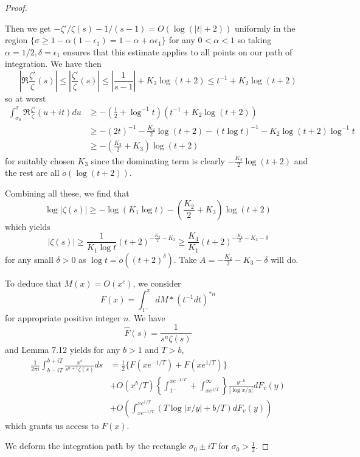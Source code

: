 \documentclass[12pt]{article}
\newcommand{\Abs}[1]{\left| #1 \right|}
\newcommand{\Fhat}{\widehat{F}}
\begin{document}
\begin{proof}
\begin{itemize}
Then we get $-\zeta'/\zeta(s) - 1/(s - 1) = O(\log(|t| + 2))$ uniformly in the region $\{\sigma \geq 1 - \alpha (1 - \epsilon_1) = 1 - \alpha + \alpha \epsilon_1 \}$ for any $0 < \alpha < 1$ so taking $\alpha = 1/2, \delta = \epsilon_1$ ensures that this estimate applies to all points on our path of integration. We have then
$$\Abs{ \Re \frac{\zeta'}{\zeta}(s) } \leq \Abs{ \frac{\zeta'}{\zeta}(s) } \leq \Abs{ \frac{1}{s - 1} } + K_2 \log(t + 2) \leq t^{-1} + K_2 \log(t + 2)$$
so at worst
\begin{align*}
\int_{\sigma_0}^\sigma \Re \frac{\zeta'}{\zeta}(u + it) du &\geq -\left(\frac12 + \log^{-1} t\right)(t^{-1} + K_2 \log(t + 2))\\
&\geq -(2t)^{-1} - \frac{K_2}{2} \log(t + 2) - (t \log t)^{-1} - K_2 \log(t + 2) \log^{-1} t\\
&\geq -\left(\frac{K_2}{2} + K_3\right) \log(t + 2)
\end{align*}
for suitably chosen $K_3$ since the dominating term is clearly $-\frac{K_2}{2} \log(t + 2)$ and the rest are all $o(\log(t + 2))$.
\end{itemize}
Combining all these, we find that
$$\log |\zeta(s)| \geq -\log(K_1 \log t) - \left(\frac{K_2}{2} + K_3\right) \log(t + 2)$$
which yields
$$|\zeta(s)| \geq \frac{1}{K_1 \log t} (t + 2)^{-\frac{K_2}{2} - K_3} \geq \frac{K_4}{K_1} (t + 2)^{-\frac{K_2}{2} - K_3 - \delta}$$
for any small $\delta > 0$ as $\log t = o((t+2)^\delta)$. Take $A = -\frac{K_2}{2} - K_3 - \delta$ will do.

To deduce that $M(x) = O(x^c)$, we consider
$$F(x) = \int_{1^-}^x dM * (t^{-1} dt)^{*n}$$
for appropriate positive integer $n$. We have
$$\Fhat(s) = \frac{1}{s^n \zeta(s)}$$
and Lemma 7.12 yields for any $b > 1$ and $T > b$,
\begin{align*}
\frac{1}{2 \pi i} \int_{b - iT}^{b + iT} \frac{x^s}{s^{n+1} \zeta(s)} ds &= \frac{1}{2}\{F(xe^{-1/T}) + F(xe^{1/T})\} \\
& + O(x^b/T) \left\{ \int_{1^-}^{xe^{-1/T}} + \int_{xe^{1/T}}^\infty \right\} \frac{y^{-b}}{|\log x/y|} dF_v(y) \\
& + O(\int_{xe^{-1/T}}^{xe^{1/T}} (T \log|x/y| + b/T) dF_v(y))
\end{align*}
which grants us access to $F(x)$.

We deform the integration path by the rectangle $\sigma_0 \pm iT$ for $\sigma_0 > \frac{1}{2}$.
\end{proof}

\unless\ifdefined\IsMainDocument
\end{document}
